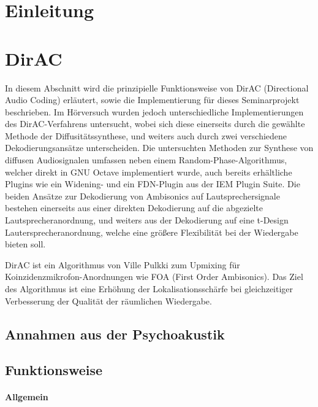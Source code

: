 \documentclass[12pt, a4paper]{article}
\begin{document}
\tableofcontents
\newpage

\section{Einleitung}


\newpage
\section{DirAC}
In diesem Abschnitt wird die prinzipielle Funktionsweise von DirAC (Directional Audio Coding) erläutert, sowie die Implementierung für dieses Seminarprojekt beschrieben. Im Hörversuch wurden jedoch unterschiedliche Implementierungen des DirAC-Verfahrens untersucht, wobei sich diese einerseits durch die gewählte Methode der Diffusitätssynthese, und weiters auch durch zwei verschiedene Dekodierungsansätze unterscheiden. Die untersuchten Methoden zur Synthese von diffusen Audiosignalen umfassen neben einem Random-Phase-Algorithmus, welcher direkt in GNU Octave implementiert wurde, auch bereits erhältliche Plugins wie ein Widening- und ein FDN-Plugin aus der IEM Plugin Suite. Die beiden Ansätze zur Dekodierung von Ambisonics auf Lautsprechersignale bestehen einerseits aus einer direkten Dekodierung auf die abgezielte Lautsprecheranordnung, und weiters aus der Dekodierung auf eine t-Design Lautersprecheranordnung, welche eine größere Flexibilität bei der Wiedergabe bieten soll.

DirAC ist ein Algorithmus von Ville Pulkki \cite{pulkki} zum Upmixing für Koinzidenzmikrofon-Anordnungen wie FOA (First Order Ambisonics). Das Ziel des Algorithmus ist eine Erhöhung der Lokalisationsschärfe bei gleichzeitiger Verbesserung der Qualität der räumlichen Wiedergabe.

\newpage

    \subsection{Annahmen aus der Psychoakustik} \label{annahmen}
    
    \subsection{Funktionsweise}
    
        \paragraph{Allgemein}
        
        
\end{document}
